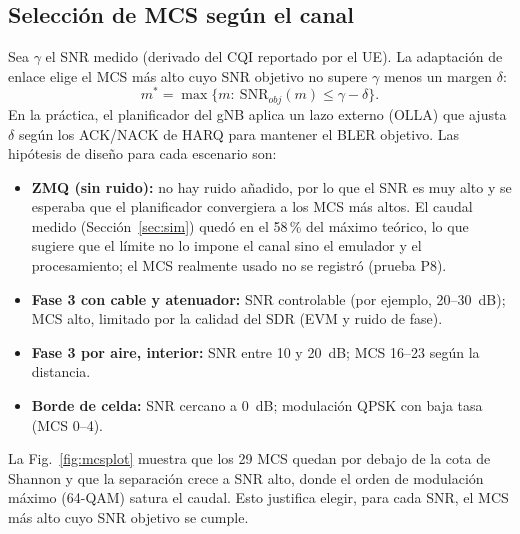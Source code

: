 \documentclass[conference]{IEEEtran}
\begin{document}
\subsection{Selección de MCS según el canal}
Sea $\gamma$ el SNR medido (derivado del CQI reportado por el UE). La adaptación de enlace elige el MCS más alto cuyo SNR objetivo no supere $\gamma$ menos un margen $\delta$:
\begin{equation}
m^{*}=\max\{m:\ \mathrm{SNR}_{obj}(m)\le\gamma-\delta\}.
\end{equation}
En la práctica, el planificador del gNB aplica un lazo externo (OLLA) que ajusta $\delta$ según los ACK/NACK de HARQ para mantener el BLER objetivo. Las hipótesis de diseño para cada escenario son:
\begin{itemize}
  \item \textbf{ZMQ (sin ruido):} no hay ruido añadido, por lo que el SNR es muy alto y se esperaba que el planificador convergiera a los MCS más altos. El caudal medido (Sección~\ref{sec:sim}) quedó en el 58\,\% del máximo teórico, lo que sugiere que el límite no lo impone el canal sino el emulador y el procesamiento; el MCS realmente usado no se registró (prueba P8).
  \item \textbf{Fase 3 con cable y atenuador:} SNR controlable (por ejemplo, 20--30~dB); MCS alto, limitado por la calidad del SDR (EVM y ruido de fase).
  \item \textbf{Fase 3 por aire, interior:} SNR entre 10 y 20~dB; MCS 16--23 según la distancia.
  \item \textbf{Borde de celda:} SNR cercano a 0~dB; modulación QPSK con baja tasa (MCS 0--4).
\end{itemize}
La Fig.~\ref{fig:mcsplot} muestra que los 29 MCS quedan por debajo de la cota de Shannon y que la separación crece a SNR alto, donde el orden de modulación máximo (64-QAM) satura el caudal. Esto justifica elegir, para cada SNR, el MCS más alto cuyo SNR objetivo se cumple.
\end{document}
